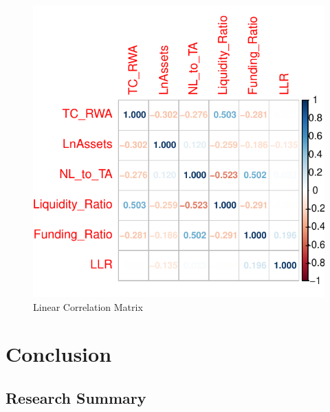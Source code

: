 \documentclass[
  12pt,
  a4paper,
]{scrreprt}
\begin{document}
{{{{\begin{figure}
{\includegraphics{chapter03-systemic_risk_files/figure-pdf/fig-appendixcorrelation-1.pdf}

}

\caption{\label{fig-appendixcorrelation}Linear Correlation Matrix}

\end{figure}%


\chapter{Conclusion}\label{conclusion-4}

\section{Research Summary}\label{research-summary}

}}}}
\end{document}
